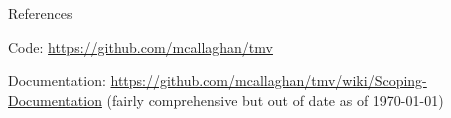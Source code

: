 \documentclass[9pt]{beamer}
\begin{document}
\begin{frame}{References}

Code: \url{https://github.com/mcallaghan/tmv}

\medskip

Documentation: \url{https://github.com/mcallaghan/tmv/wiki/Scoping-Documentation} (fairly comprehensive but out of date as of \today)

\medskip

\small

\end{frame}
\end{document}
